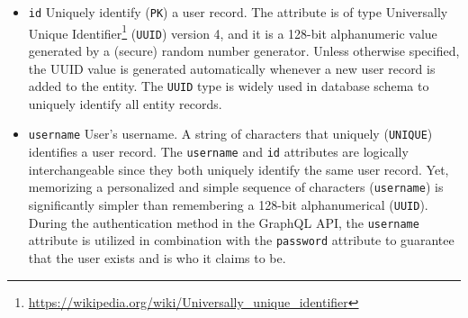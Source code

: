\begin{itemize}
  \item \texttt{id}
    \newline
    Uniquely identify (\texttt{PK}) a user record.
    \newline
    The attribute is of type Universally Unique Identifier\footnote{\url{https://wikipedia.org/wiki/Universally_unique_identifier}}
    (\texttt{UUID}) version 4, and it is a 128-bit alphanumeric value generated
    by a (secure) random number generator. Unless otherwise specified, the UUID
    value is generated automatically whenever a new user record is added to the
    entity.
    \newline
    The \texttt{UUID} type is widely used in database schema to uniquely
    identify all entity records.

  \item \texttt{username}
    \newline
    User's username.
    \newline
    A string of characters that uniquely (\texttt{UNIQUE}) identifies a user
    record.
    \newline
    The \texttt{username} and \texttt{id} attributes are logically interchangeable
    since they both uniquely identify the same user record. Yet, memorizing a personalized
    and simple sequence of characters (\texttt{username}) is significantly
    simpler than remembering a 128-bit alphanumerical (\texttt{UUID}).
    \newline
    During the authentication method in the GraphQL API, the \texttt{username}
    attribute is utilized in combination with the \texttt{password} attribute to
    guarantee that the user exists and is who it claims to be.


\end{itemize}
